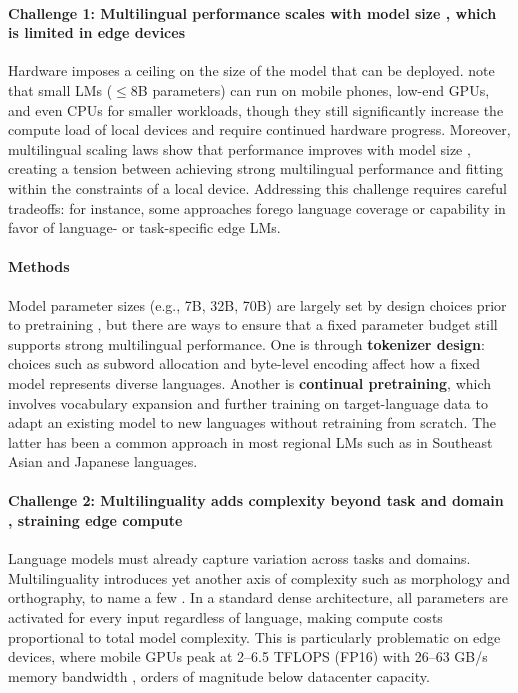 \documentclass[11pt,a4paper]{article}
\begin{document}
\paragraph{Challenge 1: Multilingual performance scales with model size \iconrepresentation{}, which is limited in edge devices \iconmemory{}}
Hardware imposes a ceiling on the size of the model that can be deployed.
\citet{jernite2026aiflopsdifferentfolks} note that small LMs ($\leq$8B parameters) can run on mobile phones, low-end GPUs, and even CPUs for smaller workloads, though they still significantly increase the compute load of local devices and require continued hardware progress.
Moreover, multilingual scaling laws show that performance improves with model size \citep{longpre2025atlasadaptivetransferscaling}, creating a tension between achieving strong multilingual performance and fitting within the constraints of a local device.
Addressing this challenge requires careful tradeoffs: for instance, some approaches forego language coverage or capability in favor of language- or task-specific edge LMs.

\paragraph{Methods}
Model parameter sizes (e.g., 7B, 32B, 70B) are largely set by design choices prior to pretraining \citep{kaplan2020scalinglawsneurallanguage}, but there are ways to ensure that a fixed parameter budget still supports strong multilingual performance.
One is through \textbf{tokenizer design}: choices such as subword allocation \citep{petrov2023language,ali-etal-2024-tokenizer} and byte-level encoding \citep{yu-etal-2023-megabyte,minixhofer2026bolmobyteifyinggenerationlanguage} affect how a fixed model represents diverse languages.
Another is \textbf{continual pretraining}, which involves vocabulary expansion \citep{kim2024efficienteffectivevocabularyexpansion,cui2024efficienteffectivetextencoding} and further training on target-language data to adapt an existing model to new languages \citep{elhady-etal-2025-emergent,li2025rethinking} without retraining from scratch.
The latter has been a common approach in most regional LMs such as in Southeast Asian \citep{ng2025sealionsoutheastasianlanguages} and Japanese \citep{fujii2024continual} languages.

\paragraph{Challenge 2: Multilinguality adds complexity beyond task and domain \iconrepresentation{}, straining edge compute \iconcompute{}}
Language models must already capture variation across tasks and domains.
Multilinguality introduces yet another axis of complexity such as morphology and orthography, to name a few \citep{tsvetkov2017lowresource}.
In a standard dense architecture, all parameters are activated for every input regardless of language, making compute costs proportional to total model complexity.
This is particularly problematic on edge devices, where mobile GPUs peak at 2--6.5 TFLOPS (FP16) with 26--63 GB/s memory bandwidth \citep{xiao2026llmpockets}, orders of magnitude below datacenter capacity.
\end{document}
